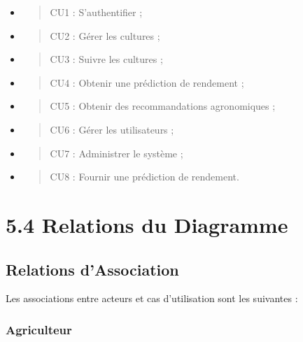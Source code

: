 \documentclass[
]{book}
\begin{document}
\begin{itemize}
\item
  \begin{quote}
  CU1 : S'authentifier ;
  \end{quote}
\item
  \begin{quote}
  CU2 : Gérer les cultures ;
  \end{quote}
\item
  \begin{quote}
  CU3 : Suivre les cultures ;
  \end{quote}
\item
  \begin{quote}
  CU4 : Obtenir une prédiction de rendement ;
  \end{quote}
\item
  \begin{quote}
  CU5 : Obtenir des recommandations agronomiques ;
  \end{quote}
\item
  \begin{quote}
  CU6 : Gérer les utilisateurs ;
  \end{quote}
\item
  \begin{quote}
  CU7 : Administrer le système ;
  \end{quote}
\item
  \begin{quote}
  CU8 : Fournir une prédiction de rendement.
  \end{quote}
\end{itemize}

\hypertarget{relations-du-diagramme}{%
\section{5.4 Relations du Diagramme}\label{relations-du-diagramme}}

\hypertarget{relations-dassociation}{%
\subsection{Relations d'Association}\label{relations-dassociation}}

Les associations entre acteurs et cas d'utilisation sont les suivantes :

\hypertarget{agriculteur-1}{%
\subsubsection{Agriculteur}\label{agriculteur-1}}
\end{document}
